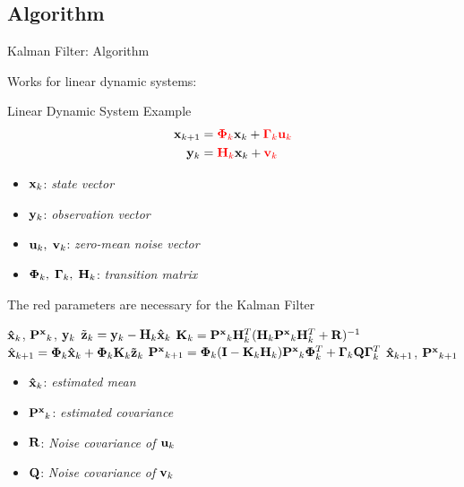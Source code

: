 \subsection{Algorithm}
\begin{frame}[allowframebreaks]{Kalman Filter: Algorithm}  %

Works for linear dynamic systems:
\begin{block}{Linear Dynamic System Example}
\begin{align*}
{\bf x}_{k+1} &= \textcolor{red}{{\bf \Phi}_k} {\bf x}_{k} + \textcolor{red}{{\bf \Gamma}_k{\bf u}_{k}}\notag\\
{\bf y}_{k} &= \textcolor{red}{{\bf H}_k}{\bf x}_{k} + \textcolor{red}{{\bf v}_{k}}
\end{align*}   
\begin{itemize}
    \item ${\bf x}_k$: {\it state vector}
    \item ${\bf y}_k$: {\it observation vector}
    \item ${\bf u}_k,\; {\bf v}_k$: {\it zero-mean noise vector}
    \item ${\bf \Phi}_k, \; {\bf \Gamma}_k, \; {\bf H}_k$: {\it transition matrix}
\end{itemize}
\end{block}

The red parameters are necessary for the Kalman Filter

\pause

\begin{algorithm}[H]
\caption{Classic Kalman Filter}
\begin{algorithmic}[1]
\REQUIRE ${\bf \hat x}_k$, ${\bf P^x}_{k}$, ${\bf y}_k$
\STATE $\tilde {\bf z}_k = {\bf y}_k - {\bf H}_k{\bf \hat x}_k$
\STATE ${\bf K}_k = {\bf P^x}_k{\bf H}^T_k({\bf H}_k{\bf P^x}_k{\bf H}^T_k+{\bf R})^{-1}$
\STATE $\hat{\bf x}_{k+1} = {\bf \Phi}_k{\bf \hat x}_k+{\bf \Phi}_k{\bf K}_k{\bf \tilde z}_k$
\STATE ${\bf P^x}_{k+1} = {\bf \Phi}_k({\bf I}-{\bf K}_k{\bf H}_k){\bf P^x}_k{\bf \Phi}^T_k + {\bf \Gamma}_k{\bf Q}{\bf \Gamma}_k^T$
\ENSURE ${\bf \hat x}_{k+1}$, ${\bf P^x}_{k+1}$
\end{algorithmic}
\end{algorithm}

\begin{itemize}
    \item ${\bf \hat x}_k$: {\it estimated mean}
    \item ${\bf P^x}_k$: {\it estimated covariance}
    \item ${\bf R}$: {\it Noise covariance of ${\bf u}_k$}
    \item ${\bf Q}$: {\it Noise covariance of ${\bf v}_k$}
\end{itemize}
\end{frame}

